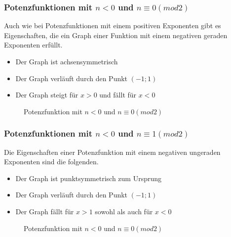 \subsubsection{Potenzfunktionen mit $n<0$ und $n\equiv0(mod2)$}
Auch wie bei Potenzfunktionen mit einem positiven Exponenten gibt es Eigenschaften, die ein Graph einer Funktion mit einem negativen geraden Exponenten erfüllt.
\begin{itemize}
	\item Der Graph ist achsensymmetrisch
	\item Der Graph verläuft durch den Punkt $(-1;1)$
	\item Der Graph steigt für $x>0$ und fällt für $x<0$
\end{itemize}
\begin{figure}[h!]
\centering
{}
\caption{Potenzfunktion mit $n<0$ und $ n\equiv0(mod2)$}
\end{figure}
\subsubsection{Potenzfunktionen mit $n<0$ und $n\equiv1(mod2)$}
Die Eigenschaften einer Potenzfunktion mit einem negativen ungeraden Exponenten sind die folgenden. 
\begin{itemize}
	\item Der Graph ist punktsymmetrisch zum Ursprung
	\item Der Graph verläuft durch den Punkt $(-1;1)$
	\item Der Graph fällt für $x>1$ sowohl als auch für $x<0$
\end{itemize}
\begin{figure}[h!]
\centering
{}
\caption{Potenzfunktion mit $n<0$ und $ n\equiv0(mod2)$}
\end{figure}
